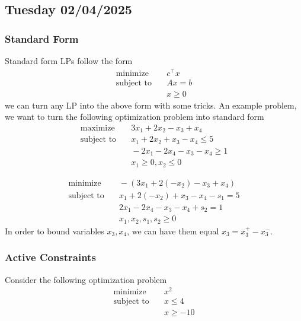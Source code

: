 \subsection{Tuesday 02/04/2025}

\subsubsection{Standard Form}
Standard form LPs follow the form 
\begin{align}
  \text{minimize} & \quad c^\top x \\
  \text{subject to} & \quad Ax = b \\
  & \quad x \geq 0
\end{align}
we can turn any LP into the above form with some tricks.
An example problem, we want to turn the following optimization problem into standard form
\begin{align}
  \text{maximize} & \quad 3 x_1 + 2 x_2 - x_3 + x_4 \\
  \text{subject to} & \quad x_1 + 2 x_2 + x_3 - x_4 \leq 5 \\
  & \quad -2 x_1 - 2x_4 - x_3 - x_4 \geq 1 \\
  & \quad x_1 \geq 0, x_2 \leq 0 
\end{align}

\begin{align}
  \text{minimize} & \quad -(3 x_1 + 2 (-x_2) - x_3 + x_4)  \\
  \text{subject to} & \quad x_1 + 2 (-x_2) + x_3 - x_4 - s_1 = 5 \\
  & \quad 2 x_1 - 2x_4 - x_3 - x_4 + s_2 = 1 \\
  & \quad x_1, x_2, s_1, s_2 \geq 0
\end{align}
In order to bound variables $x_3, x_4$, we can have them equal $x_3 = x_3^+ - x_3^-$.

\subsubsection{Active Constraints}
Consider the following optimization problem 
\begin{align}
  \text{minimize} & \quad x^2 \\
  \text{subject to} & \quad x \leq 4 \\
  & \quad x \geq -10
\end{align}

